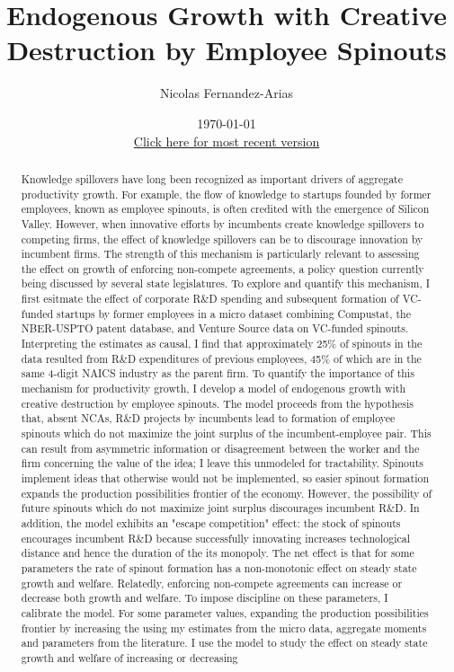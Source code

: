 \documentclass[12pt,english]{article}
\theoremstyle{remark}
\begin{document}
	
\title{Endogenous Growth with Creative Destruction by Employee Spinouts}
\author{Nicolas Fernandez-Arias}
\date{\today \\ \small
	\href{https://drive.google.com/open?id=1NZCBFnkxug8qXWAZLTir6dEmIy9LuEBg}{Click here for most recent version}}
\maketitle

\begin{abstract}
	Knowledge spillovers have long been recognized as important drivers of aggregate productivity growth. For example, the flow of knowledge to startups founded by former employees, known as employee spinouts, is often credited with the emergence of Silicon Valley. However, when innovative efforts by incumbents create knowledge spillovers to competing firms, the effect of knowledge spillovers can be to discourage innovation by incumbent firms. The strength of this mechanism is particularly relevant to assessing the effect on growth of enforcing non-compete agreements, a policy question currently being discussed by several state legislatures. To explore and quantify this mechanism, I first esitmate the effect of corporate R\&D spending and subsequent formation of VC-funded startups by former employees in a micro dataset combining Compustat, the NBER-USPTO patent database, and Venture Source data on VC-funded spinouts. Interpreting the estimates as causal, I find that approximately 25\% of spinouts in the data resulted from R\&D expenditures of previous employees, 45\% of which are in the same 4-digit NAICS industry as the parent firm. To quantify the importance of this mechanism for productivity growth, I develop a model of endogenous growth with creative destruction by employee spinouts. The model proceeds from the hypothesis that, absent NCAs, R\&D projects by incumbents lead to formation of employee spinouts which do not maximize the joint surplus of the incumbent-employee pair. This can result from asymmetric information or disagreement between the worker and the firm concerning the value of the idea; I leave this unmodeled for tractability. Spinouts implement ideas that otherwise would not be implemented, so easier spinout formation expands the production possibilities frontier of the economy. However, the possibility of future spinouts which do not maximize joint surplus discourages incumbent R\&D. In addition, the model exhibits an "escape competition" effect: the stock of spinouts encourages incumbent R\&D because successfully innovating increases technological distance and hence the duration of the its monopoly. The net effect is that for some parameters the rate of spinout formation has a non-monotonic effect on steady state growth and welfare. Relatedly, enforcing non-compete agreements can increase or decrease both growth and welfare. To impose discipline on these parameters, I calibrate the model. For some parameter values, expanding the production possibilities frontier by increasing the using my estimates from the micro data, aggregate moments and parameters from the literature. I use the model to study the effect on steady state growth and welfare of increasing or decreasing 
\end{abstract}
\end{document}
